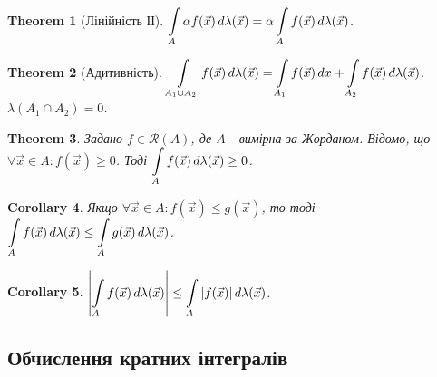 \documentclass[a4paper, 10pt]{article}
\def\huge{\displaystyle}
\theoremstyle{theoremdd}
\newtheorem{theorem}{Theorem}[subsection]
\theoremstyle{theoremdd}
\theoremstyle{theoremdd}
\theoremstyle{theoremdd}
\theoremstyle{theoremdd}
\theoremstyle{theoremdd}
\theoremstyle{theoremdd}
\theoremstyle{theoremdd}
\newtheorem{corollary}[theorem]{Corollary}
\begin{document}
\begin{theorem}[Лінійність ІІ]
$\huge\int\displaylimits_A \alpha f(\vec{x})\,d\lambda(\vec{x}) = \alpha \int\displaylimits_A f(\vec{x})\,d\lambda(\vec{x})$.\\
\end{theorem}

\begin{theorem}[Адитивність]
$\huge\int\displaylimits_{A_1 \cup A_2} f(\vec{x})\,d\lambda(\vec{x}) = \int\displaylimits_{A_1} f(\vec{x})\,dx + \int\displaylimits_{A_2} f(\vec{x})\,d\lambda(\vec{x})$.\\
$\lambda(A_1 \cap A_2) = 0$.
\end{theorem}

\begin{theorem}
Задано $f \in \mathcal{R}(A)$, де $A$ - вимірна за Жорданом. Відомо, що $\forall \vec{x} \in A: f(\vec{x}) \geq 0$. Тоді $\huge\int\displaylimits_A f(\vec{x})\,d\lambda(\vec{x}) \geq 0$.
\end{theorem}

\begin{corollary}
Якщо $\forall \vec{x} \in A: f(\vec{x}) \leq g(\vec{x})$, то тоді $\huge\int\displaylimits_A f(\vec{x})\,d\lambda(\vec{x}) \leq \int\displaylimits_A g(\vec{x})\,d\lambda(\vec{x})$.
\end{corollary}

\begin{corollary}
$\huge \abs{\int\displaylimits_A f(\vec{x})\,d\lambda(\vec{x})} \leq \int\displaylimits_A |f(\vec{x})|\,d\lambda(\vec{x})$.
\end{corollary}

\subsection{Обчислення кратних інтегралів}
\end{document}
